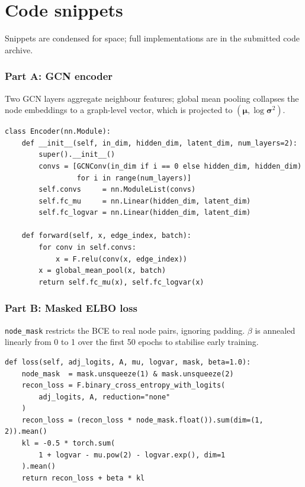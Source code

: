 \section*{Code snippets}

\noindent Snippets are condensed for space; full implementations are in the submitted code archive.

\subsubsection*{Part A: GCN encoder}
Two GCN layers aggregate neighbour features; global mean pooling collapses the node embeddings to a
graph-level vector, which is projected to $(\boldsymbol{\mu}, \log\boldsymbol{\sigma}^2)$.
\begin{lstlisting}
class Encoder(nn.Module):
    def __init__(self, in_dim, hidden_dim, latent_dim, num_layers=2):
        super().__init__()
        convs = [GCNConv(in_dim if i == 0 else hidden_dim, hidden_dim)
                 for i in range(num_layers)]
        self.convs     = nn.ModuleList(convs)
        self.fc_mu     = nn.Linear(hidden_dim, latent_dim)
        self.fc_logvar = nn.Linear(hidden_dim, latent_dim)

    def forward(self, x, edge_index, batch):
        for conv in self.convs:
            x = F.relu(conv(x, edge_index))
        x = global_mean_pool(x, batch)
        return self.fc_mu(x), self.fc_logvar(x)
\end{lstlisting}

\subsubsection*{Part B: Masked ELBO loss}
\texttt{node\_mask} restricts the BCE to real node pairs, ignoring padding. $\beta$ is annealed
linearly from 0 to 1 over the first 50 epochs to stabilise early training.
\begin{lstlisting}
def loss(self, adj_logits, A, mu, logvar, mask, beta=1.0):
    node_mask  = mask.unsqueeze(1) & mask.unsqueeze(2)
    recon_loss = F.binary_cross_entropy_with_logits(
        adj_logits, A, reduction="none"
    )
    recon_loss = (recon_loss * node_mask.float()).sum(dim=(1, 2)).mean()
    kl = -0.5 * torch.sum(
        1 + logvar - mu.pow(2) - logvar.exp(), dim=1
    ).mean()
    return recon_loss + beta * kl
\end{lstlisting}

